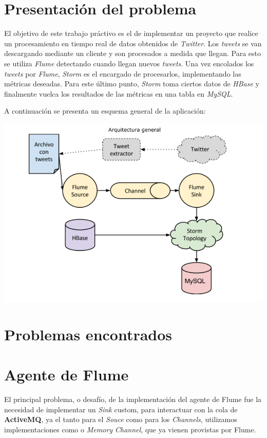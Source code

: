\documentclass[a4paper,10pt]{article}
\begin{document}
\setcounter{page}{1}


\section{Presentación del problema}
El objetivo de este trabajo práctivo es el de implementar un proyecto que realice un procesamiento en tiempo real de datos obtenidos de \textit{Twitter}.
Los \textit{tweets} se van descargando mediante un cliente y son procesados a medida que llegan. Para esto se utiliza \textit{Flume} detectando cuando llegan nuevos \textit{tweets}. 
Una vez encolados los \textit{tweets} por \textit{Flume}, \textit{Storm} es el encargado de procesarlos, implementando las métricas deseadas. Para este último punto, \textit{Storm}
toma ciertos datos de \textit{HBase} y finalmente vuelca los resultados de las métricas en una tabla en \textit{MySQL}.

A continuación se presenta un esquema general de la aplicación:

\includegraphics{images/tp2BD.png}

\section{Problemas encontrados}

\section{Agente de Flume}
El principal problema, o desafío, de la implementación del agente de Flume fue la necesidad de implementar un \textit{Sink} custom, para interactuar con la cola
de \textbf{ActiveMQ}, ya el tanto para el \textit{Souce} como para los \textit{Channels}, utilizamos implementaciones como  o \textit{Memory Channel},
que ya vienen provistas por Flume.
\end{document}
